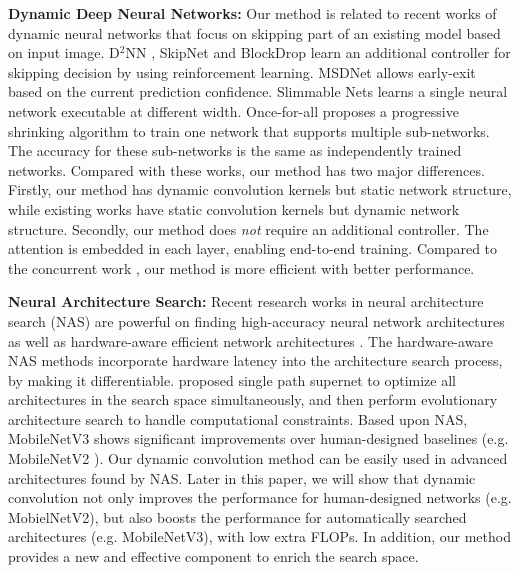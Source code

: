 \documentclass[10pt,twocolumn,letterpaper]{article}
\begin{document}
\noindent \textbf{Dynamic Deep Neural Networks:} Our method is related to recent works of dynamic neural networks \cite{NIPS2017_6813, liu2018ddnn, Wang_2018_ECCV, Wu_2018_CVPR, yu2018slimmable, huang2018multiscale} that focus on skipping part of an existing model based on input image. D$^2$NN \cite{liu2018ddnn}, SkipNet \cite{Wang_2018_ECCV} and  BlockDrop \cite{Wu_2018_CVPR} learn an additional controller for skipping decision by using reinforcement learning. MSDNet \cite{huang2018multiscale} allows early-exit based on the current prediction confidence. Slimmable Nets \cite{yu2018slimmable} learns a single neural network executable at different width. Once-for-all \cite{Cai2019OnceFA} proposes a progressive shrinking algorithm to train one network that supports multiple sub-networks. The accuracy for these sub-networks is the same as independently trained networks.
Compared with these works, our method has two major differences. Firstly, our method has dynamic convolution kernels but static network structure, while existing works have static convolution kernels but dynamic network structure. Secondly, our method does \textit{not} require an additional controller. The attention is embedded in each layer, enabling end-to-end training. Compared to the concurrent work \cite{Yang2019CondConvCP}, our method is more efficient with better performance.

\noindent \textbf{Neural Architecture Search:} Recent research works in neural architecture search (NAS) are powerful on finding high-accuracy neural network architectures \cite{Zoph2017NeuralAS, real2018aaai, Zoph_2018_CVPR, liu2018darts, xie2018snas} as well as hardware-aware efficient network architectures \cite{cai2018proxylessnas, Tan_2019_CVPR, Wu_2019_CVPR}. The hardware-aware NAS methods incorporate hardware latency into the architecture search process, by making it differentiable. \cite{guo2019single} proposed single path supernet to optimize all architectures in the search space simultaneously, and then perform evolutionary architecture search to handle computational constraints. Based upon NAS, MobileNetV3 \cite{howard2019mbnetv3} shows significant improvements over human-designed baselines (e.g. MobileNetV2 \cite{sandler2018mobilenetv2}).
%
Our dynamic convolution method can be easily used in advanced architectures found by NAS. Later in this paper, we will show that dynamic convolution not only improves the performance for human-designed networks (e.g. MobielNetV2), but also boosts the performance for automatically searched architectures (e.g. MobileNetV3), with low extra FLOPs. In addition, our method provides a new and effective component to enrich the search space.
\end{document}
